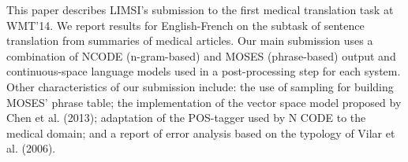 This paper describes LIMSI's submission to the first medical translation task at WMT'14. We report results for English-French on the subtask of sentence translation from summaries of medical articles. Our main submission uses a combination of NCODE (n-gram-based) and MOSES (phrase-based) output and continuous-space language models used in a post-processing step for each system. Other characteristics of our submission include: the use of sampling for building MOSES' phrase table; the implementation of the vector space model proposed by Chen et al. (2013); adaptation of the POS-tagger used by N CODE to the medical domain; and a report of error analysis based on the typology of Vilar et al. (2006).
